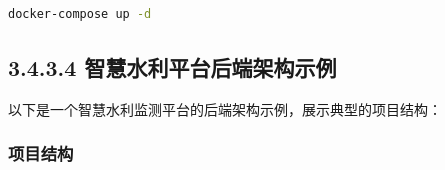 \begin{lstlisting}[language=bash]
docker-compose up -d
\end{lstlisting}

\subsection{3.4.3.4
智慧水利平台后端架构示例}\label{ux667aux6167ux6c34ux5229ux5e73ux53f0ux540eux7aefux67b6ux6784ux793aux4f8b}

以下是一个智慧水利监测平台的后端架构示例，展示典型的项目结构：

\subsubsection{项目结构}\label{ux9879ux76eeux7ed3ux6784}

